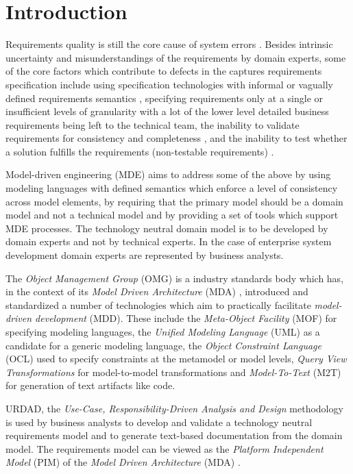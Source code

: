\section{Introduction}

Requirements quality is still the core cause of system errors \cite{heck_experiences_2008}. Besides intrinsic uncertainty and misunderstandings of the requirements by domain experts, some of the core factors which contribute to defects in the captures requirements specification include using specification technologies with informal or vagually defined requirements semantics \cite{ferguson_empirical_2006}, specifying requirements only at a single or insufficient levels of granularity with a lot of the lower level detailed business requirements being left to the technical team, the inability to validate requirements for consistency and completeness \cite{somebodyPleaseFindASuitableReference}, and the inability to test whether a solution fulfills the requirements (non-testable requirements) \cite{bashardoust-tajali_extracting_2008}.

Model-driven engineering (MDE) aims to address some of the above by using modeling languages with defined semantics which enforce a level of consistency across model elements, by requiring that the primary model should be a domain model and not a technical model and by providing a set of tools which support MDE processes. The technology neutral domain model is to be developed by domain experts and not by technical experts. In the case of enterprise system development domain experts are represented by business analysts.

The {\em Object Management Group} (OMG) is a industry standards body which has, in the context of its {\em Model Driven Architecture} (MDA) \cite{siegel_developing_2001}, introduced and standardized a number of technologies which aim to practically facilitate {\em model-driven development} (MDD). These include the {\em Meta-Object Facility} (MOF) for specifying modeling languages, the {\em Unified Modeling Language} (UML) as a candidate for a generic modeling language, the {\em Object Constraint Language} (OCL) used to specify constraints at the metamodel or model levels, {\em Query View Transformations} for model-to-model transformations and {\em Model-To-Text} (M2T) for generation of text artifacts like code. 

URDAD, the {\em Use-Case, Responsibility-Driven Analysis and Design} \cite{solms_technology_2007} methodology is used by business analysts to develop and validate a technology neutral requirements model and to generate text-based documentation from the domain model. The requirements model can be viewed as the {\em Platform Independent Model} (PIM) of the {\em Model Driven Architecture} (MDA) \cite{solms_urdad_2010}.


